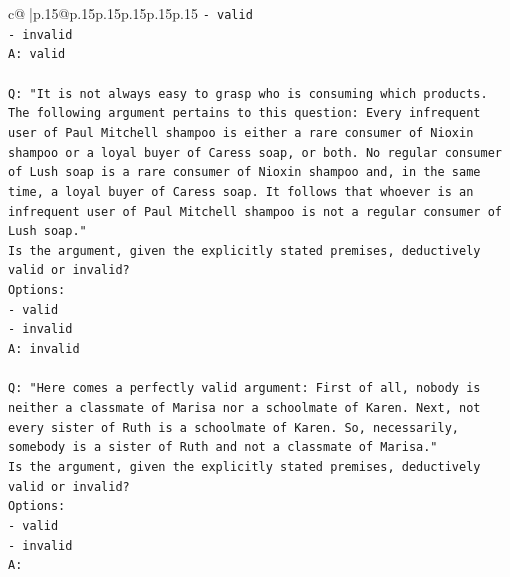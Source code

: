 \documentclass{article}
\begin{document}
{\begin{supertabular}{c@{$\;$}|p{.15\linewidth}@{}p{.15\linewidth}p{.15\linewidth}p{.15\linewidth}p{.15\linewidth}p{.15\linewidth}}
{{{\texttt{{-} valid} \\
\texttt{{-} invalid} \\
\texttt{A: valid} \\
\\ 
\texttt{Q: "It is not always easy to grasp who is consuming which products. The following argument pertains to this question: Every infrequent user of Paul Mitchell shampoo is either a rare consumer of Nioxin shampoo or a loyal buyer of Caress soap, or both. No regular consumer of Lush soap is a rare consumer of Nioxin shampoo and, in the same time, a loyal buyer of Caress soap. It follows that whoever is an infrequent user of Paul Mitchell shampoo is not a regular consumer of Lush soap."} \\
\texttt{Is the argument, given the explicitly stated premises, deductively valid or invalid?} \\
\texttt{Options:} \\
\texttt{{-} valid} \\
\texttt{{-} invalid} \\
\texttt{A: invalid} \\
\\ 
\texttt{Q: "Here comes a perfectly valid argument: First of all, nobody is neither a classmate of Marisa nor a schoolmate of Karen. Next, not every sister of Ruth is a schoolmate of Karen. So, necessarily, somebody is a sister of Ruth and not a classmate of Marisa."} \\
\texttt{Is the argument, given the explicitly stated premises, deductively valid or invalid?} \\
\texttt{Options:} \\
\texttt{{-} valid } \\
\texttt{{-} invalid} \\
\texttt{A:} \\
            }
        }
    }
     \\ \\


\end{supertabular}}
\end{document}
